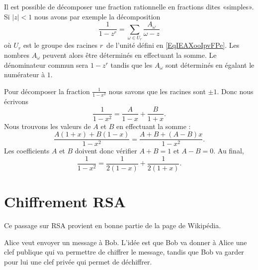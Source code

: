 Il est possible de décomposer une fraction rationnelle en fractions dites «simples». Si \( | z |<1\) nous avons par exemple la décomposition
\begin{equation}        \label{EqDWYBooJIMBAt}
	\frac{1}{ 1-z^r }=\sum_{\omega\in U_r}\frac{ A_{\omega} }{ \omega-z }
\end{equation}
où \( U_r\) est le groupe des racines \( r\)\ieme\ de l'unité défini en \eqref{EqIEAXooIpvFPe}. Les nombres \( A_{\omega}\) peuvent alors être déterminés en effectuant la somme. Le dénominateur commun sera \( 1-z^r\) tandis que les \( A_{\omega}\) sont déterminés en égalant le numérateur à \( 1\).

\begin{example}
	Pour décomposer la fraction \( \frac{1}{ 1-x^2 }\) nous savons que les racines sont \( \pm 1\). Donc nous écrivons
	\begin{equation}
		\frac{1}{ 1-x^2 }=\frac{ A }{ 1-x }+\frac{ B }{ 1+x }.
	\end{equation}
	Nous trouvons les valeurs de \( A\) et \( B\) en effectuant la somme :
	\begin{equation}
		\frac{ A(1+x)+B(1-x) }{ 1-x^2 }=\frac{ A+B+(A-B)x }{ 1-x^2 }.
	\end{equation}
	Les coefficients \( A\) et \( B\) doivent donc vérifier \( A+B=1\) et \( A-B=0\). Au final,
	\begin{equation}
		\frac{1}{ 1-x^2 }=\frac{1}{ 2(1-x) }+\frac{1}{ 2(1+x) }.
	\end{equation}
\end{example}

\section{Chiffrement RSA}
\label{SecEVaFYi}

Ce passage sur RSA provient en bonne partie de la page de Wikipédia\cite{ooRIFDooNxOehF}.

Alice veut envoyer un message à Bob. L'idée est que Bob va donner à Alice une clef publique qui va permettre de chiffrer le message, tandis que Bob va garder pour lui une clef privée qui permet de déchiffrer.

